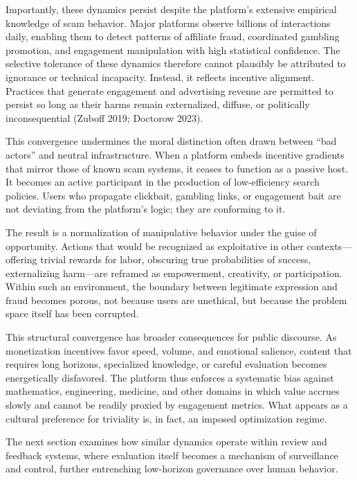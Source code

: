 \documentclass[12pt]{article}
\begin{document}
Importantly, these dynamics persist despite the platform’s extensive empirical knowledge of scam behavior. Major platforms observe billions of interactions daily, enabling them to detect patterns of affiliate fraud, coordinated gambling promotion, and engagement manipulation with high statistical confidence. The selective tolerance of these dynamics therefore cannot plausibly be attributed to ignorance or technical incapacity. Instead, it reflects incentive alignment. Practices that generate engagement and advertising revenue are permitted to persist so long as their harms remain externalized, diffuse, or politically inconsequential (Zuboff 2019; Doctorow 2023).

This convergence undermines the moral distinction often drawn between “bad actors” and neutral infrastructure. When a platform embeds incentive gradients that mirror those of known scam systems, it ceases to function as a passive host. It becomes an active participant in the production of low-efficiency search policies. Users who propagate clickbait, gambling links, or engagement bait are not deviating from the platform’s logic; they are conforming to it.

The result is a normalization of manipulative behavior under the guise of opportunity. Actions that would be recognized as exploitative in other contexts—offering trivial rewards for labor, obscuring true probabilities of success, externalizing harm—are reframed as empowerment, creativity, or participation. Within such an environment, the boundary between legitimate expression and fraud becomes porous, not because users are unethical, but because the problem space itself has been corrupted.

This structural convergence has broader consequences for public discourse. As monetization incentives favor speed, volume, and emotional salience, content that requires long horizons, specialized knowledge, or careful evaluation becomes energetically disfavored. The platform thus enforces a systematic bias against mathematics, engineering, medicine, and other domains in which value accrues slowly and cannot be readily proxied by engagement metrics. What appears as a cultural preference for triviality is, in fact, an imposed optimization regime.

The next section examines how similar dynamics operate within review and feedback systems, where evaluation itself becomes a mechanism of surveillance and control, further entrenching low-horizon governance over human behavior.
\end{document}
